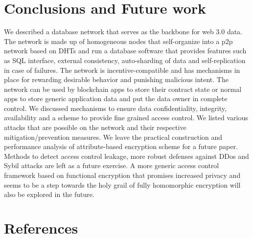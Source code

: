 \documentclass[preprint,10pt]{elsarticle}
\theoremstyle{definition}
\begin{document}
\section{Conclusions and Future work}
We described a database network that serves as the backbone for web 3.0 data. The network is made up of homogeneous nodes that self-organize into a p2p network based on DHTs and run a database software that provides features such as SQL interface, external consistency, auto-sharding of data and self-replication in case of failures. The network is incentive-compatible and has mechanisms in place for rewarding desirable behavior and punishing malicious intent. The network can be used by blockchain apps to store their contract state or normal apps to store generic application data and put the data owner in complete control. We discussed mechanisms to ensure data confidentiality, integrity, availability and a scheme to provide fine grained access control. We listed various attacks that are possible on the network and their respective mitigation/prevention measures.
\newline\newline
We leave the practical construction and performance analysis of attribute-based encryption scheme for a future paper. Methods to detect access control leakage, more robust defenses against DDos and Sybil attacks are left as a future exercise. A more generic access control framework based on functional encryption \cite{functional_encryption} that promises increased privacy and seems to be a step towards the holy grail of fully homomorphic encryption \cite{FHE} will also be explored in the future.
\section{References}



\end{document}
